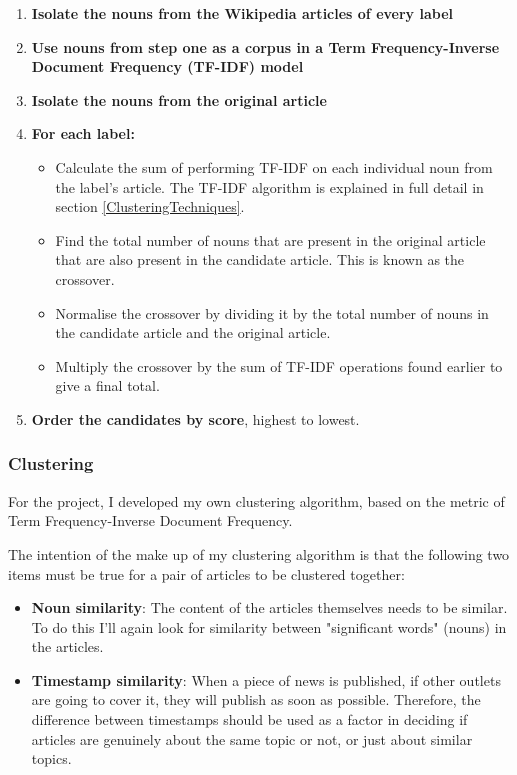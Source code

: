 \documentclass[12pt]{article}
\begin{document}
\begin{enumerate}
	\item \textbf{Isolate the nouns from the Wikipedia articles of every label}\\
	\item \textbf{Use nouns from step one as a corpus in a Term Frequency-Inverse Document Frequency (TF-IDF) model} \\
	\item \textbf{Isolate the nouns from the original article} \\
	\item \textbf{For each label:}
		\begin{itemize}
			\item Calculate the sum of performing TF-IDF on each individual noun from the label's article. The TF-IDF algorithm is explained in full detail in section \ref{ClusteringTechniques}. \\
			\item Find the total number of nouns that are present in the original article that are also present in the candidate article. This is known as the crossover. \\
			\item Normalise the crossover by dividing it by the total number of nouns in the candidate article and the original article. \\
			\item Multiply the crossover by the sum of TF-IDF operations found earlier to give a final total. \\
		\end{itemize}
	\item \textbf{Order the candidates by score}, highest to lowest.\\
\end{enumerate}

\subsubsection{Clustering}

For the project, I developed my own clustering algorithm, based on the metric of Term Frequency-Inverse Document Frequency. 

The intention of the make up of my clustering algorithm is that the following two items must be true for a pair of articles to be clustered together: \\

\begin{itemize}
	\item \textbf{Noun similarity}: The content of the articles themselves needs to be similar. To do this I'll again look for similarity between "significant words" (nouns) in the articles. \\
	\item \textbf{Timestamp similarity}: When a piece of news is published, if other outlets are going to cover it, they will publish as soon as possible. Therefore, the difference between timestamps should be used as a factor in deciding if articles are genuinely about the same topic or not, or just about similar topics. \\
\end{itemize}
\end{document}
